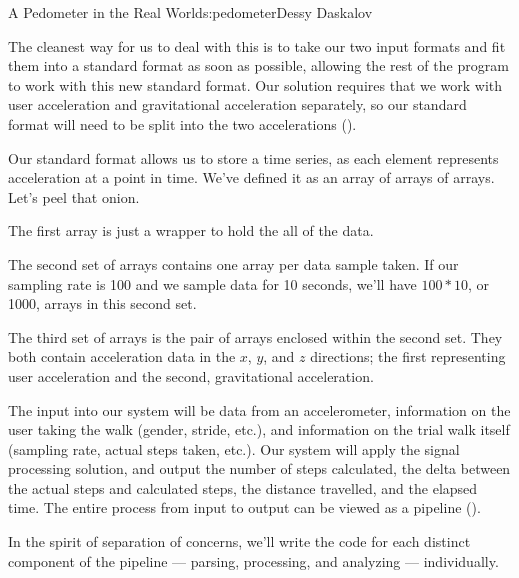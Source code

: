\begin{aosachapter}{A Pedometer in the Real World}{s:pedometer}{Dessy Daskalov}
\label{standard-format}

The cleanest way for us to deal with this is to take our two input
formats and fit them into a standard format as soon as possible,
allowing the rest of the program to work with this new standard format.
Our solution requires that we work with user acceleration and
gravitational acceleration separately, so our standard format will need
to be split into the two accelerations
().


Our standard format allows us to store a time series, as each element
represents acceleration at a point in time. We've defined it as an array
of arrays of arrays. Let's peel that onion.

\begin{aosaitemize}

\item
  The first array is just a wrapper to hold the all of the data.
\item
  The second set of arrays contains one array per data sample taken. If
  our sampling rate is 100 and we sample data for 10 seconds, we'll have
  $100 * 10$, or 1000, arrays in this second set.
\item
  The third set of arrays is the pair of arrays enclosed within the
  second set. They both contain acceleration data in the $x$, $y$, and
  $z$ directions; the first representing user acceleration and the
  second, gravitational acceleration.
\end{aosaitemize}

\label{the-pipeline}

The input into our system will be data from an accelerometer,
information on the user taking the walk (gender, stride, etc.), and
information on the trial walk itself (sampling rate, actual steps taken,
etc.). Our system will apply the signal processing solution, and output
the number of steps calculated, the delta between the actual steps and
calculated steps, the distance travelled, and the elapsed time. The
entire process from input to output can be viewed as a pipeline
().


In the spirit of separation of concerns, we'll write the code for each
distinct component of the pipeline --- parsing, processing, and
analyzing --- individually.


\end{aosachapter}
